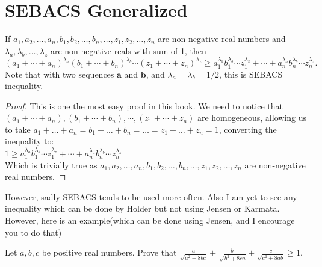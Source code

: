 \section{SEBACS Generalized}
\begin{theorem}
    If $a_1, a_2, \dotsc, a_n, b_1, b_2, \dotsc, b_n, \dotsc, z_1, z_2, \dotsc, z_n$ are non-negative real numbers and $\lambda_a, \lambda_b, \dotsc, \lambda_z$ are non-negative reals with sum of 1, then\[(a_1 + \dotsb + a_n)^{\lambda_a} (b_1 + \dotsb + b_n)^{\lambda_b} \dotsm (z_1 + \dotsb + z_n)^{\lambda_z} \geq a_1^{\lambda_a}b_1^{\lambda_b} \dotsm z_1^{\lambda_z} + \dotsb + a_n^{\lambda_a}b_n^{\lambda_b} \dotsm z_n^{\lambda_z}.\]
Note that with two sequences $\mathbf{a}$ and $\mathbf{b}$, and $\lambda_a = \lambda_b = 1/2$, this is SEBACS inequality.
\end{theorem}
\begin{proof}
    This is one the most easy proof in this book. We need to notice that $(a_1 + \dotsb + a_n), (b_1 + \dotsb + b_n), \dotsm, (z_1 + \dotsb + z_n)$ are homogeneous, allowing us to take $a_1+\dots+a_n=b_1+\dots+b_n=\dots=z_1+\dots+z_n=1$, converting the inequality to:\\
    $1 \geq a_1^{\lambda_a}b_1^{\lambda_b} \dotsm z_1^{\lambda_z} + \dotsb + a_n^{\lambda_a}b_n^{\lambda_b} \dotsm z_n^{\lambda_z}$\\
    Which is trivially true as $a_1, a_2, \dotsc, a_n, b_1, b_2, \dotsc, b_n, \dotsc, z_1, z_2, \dotsc, z_n$ are non-negative real numbers.
\end{proof}
However, sadly SEBACS tends to be used more often. Also I am yet to see any inequality which can be done by Holder but not using Jensen or Karmata. However, here is an example(which can be done using Jensen, and I encourage you to do that)\\
\begin{example}
    Let $a,b,c$ be positive real numbers. Prove that $\frac{a}{\sqrt{a^{2}+8bc}}+\frac{b}{\sqrt{b^{2}+8ca}}+\frac{c}{\sqrt{c^{2}+8ab}}\ge 1$.
\end{example}
